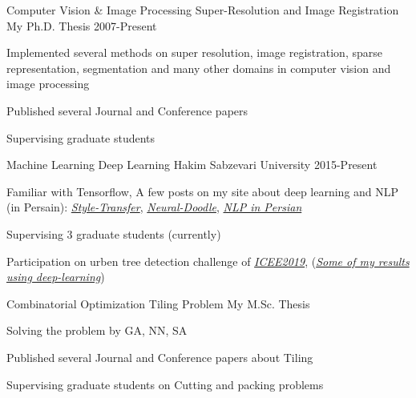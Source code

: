 

\begin{cventries}



\cventry
{Computer Vision \& Image Processing} %
{Super-Resolution and Image Registration} %
{My Ph.D. Thesis} %
{2007-Present} %
{
	\begin{cvitems} %
		\item {Implemented several methods on super resolution, image registration, sparse representation, segmentation and many other domains in computer vision and image processing}
		\item {Published several Journal and Conference papers}
		\item{Supervising graduate students}
	\end{cvitems}
}


 \cventry
{Machine Learning} %
{Deep Learning} %
{Hakim Sabzevari University} %
{2015-Present} %
{
	\begin{cvitems} %
		\item {Familiar with Tensorflow, A few posts on my site about deep learning and NLP (in Persain): \href{http://mamintoosi.ir/wp/neural-style-transfer/}{\textit{Style-Transfer}}, \href{http://mamintoosi.ir/wp/neural-doodle/}{\textit{Neural-Doodle}}, \href{http://mamintoosi.ir/wp/king-minus-man-plus-woman-yields-queen/}{\textit{NLP in Persian}} }
		\item{Supervising 3 graduate students (currently)}
		\item{Participation on urben tree detection challenge of \href{http://icee2019.yazd.ac.ir/Home}{\textit{ICEE2019}}, (\href{https://drive.google.com/drive/folders/1-VINGtdTzNe-tWuzHCM1lVCU_44IuTfH}{\textit{Some of my results using deep-learning}})}
	\end{cvitems}
}

  \cventry
    {Combinatorial Optimization} %
    {Tiling Problem} %
    {My M.Sc. Thesis} %
    {} %
    {
      \begin{cvitems} %
        \item {Solving the problem by GA, NN, SA}
        \item {Published several Journal and Conference  papers about Tiling}
        \item{Supervising graduate students on Cutting and packing problems}
      \end{cvitems}
    }
    

\end{cventries}
